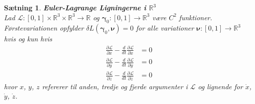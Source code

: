 \documentclass[12pt]{article}
\newtheorem{thm}{Sætning}
\begin{document}
\begin{thm} {\bf Euler-Lagrange Ligningerne i $\mathbb{R}^3$}\\
Lad $\mathcal{L} : [0,1] \times \mathbb{R}^3 \times \mathbb{R}^3 \to \mathbb{R}$ og ${\boldsymbol \gamma}_0 : [0,1] \to \mathbb{R}^3$ være $C^2$ funktioner. Førstevariationen opfylder $\delta L({\boldsymbol \gamma}_0, {\boldsymbol \nu}) = 0$ for alle variationer ${\boldsymbol \nu} :  [0,1] \to \mathbb{R}^3$ hvis og kun hvis
\begin{align}
\frac{\partial\mathcal{L}}{\partial x} -\frac{d}{dt}\frac{\partial\mathcal{L}}{\partial \dot{x}} &= 0 \\
\frac{\partial\mathcal{L}}{\partial y} -\frac{d}{dt} \frac{\partial\mathcal{L}}{\partial \dot{y}} &=0 \\
\frac{\partial\mathcal{L}}{\partial z} -\frac{d}{dt} \frac{\partial\mathcal{L}}{\partial \dot{z}} &=0
\end{align}
hvor $x$, $y$, $z$ refererer til anden, tredje og fjerde argumenter i $\mathcal{L}$ og lignende for $\dot{x}$, $\dot{y}$, $\dot{z}$.
\end{thm}
\end{document}
